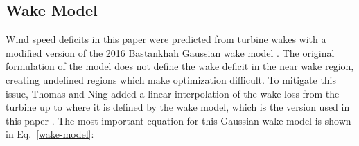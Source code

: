 \documentclass[wes, manuscript]{copernicus}
\begin{document}
\subsection{Wake Model}

Wind speed deficits in this paper were predicted from turbine wakes with a modified version of the 2016 Bastankhah Gaussian wake model \citep{bastankhah2016experimental}. The original formulation of the model does not define the wake deficit in the near wake region, creating undefined regions which make optimization difficult. 
To mitigate this issue, Thomas and Ning added a linear interpolation of the wake loss from the turbine up to where it is defined by the wake model, which is the version used in this paper \citep{Thomas2018}. 
The most important equation for this Gaussian wake model is shown in Eq.~\ref{wake-model}:
\end{document}
